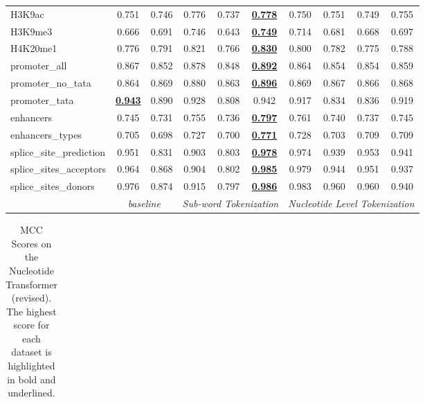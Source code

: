 \begin{table*}[h!]
\begin{center}
\begin{tabular}{l|cc|ccc|cccc}
H3K9ac & 0.751 & 0.746 & 0.776 & 0.737 & {\ul \textbf{0.778}} & 0.750 & 0.751 & 0.749 & 0.755 \\
H3K9me3 & 0.666 & 0.691 & 0.746 & 0.643 & {\ul \textbf{0.749}} & 0.714 & 0.681 & 0.668 & 0.697 \\
H4K20me1 & 0.776 & 0.791 & 0.821 & 0.766 & {\ul \textbf{0.830}} & 0.800 & 0.782 & 0.775 & 0.788 \\
promoter\_all & 0.867 & 0.852 & 0.878 & 0.848 & {\ul \textbf{0.892}} & 0.864 & 0.854 & 0.854 & 0.859 \\
promoter\_no\_tata & 0.864 & 0.869 & 0.880 & 0.863 & {\ul \textbf{0.896}} & 0.869 & 0.867 & 0.866 & 0.868 \\
promoter\_tata & {\ul \textbf{0.943}} & 0.890 & 0.928 & 0.808 & 0.942 & 0.917 & 0.834 & 0.836 & 0.919 \\
enhancers & 0.745 & 0.731 & 0.755 & 0.736 & {\ul \textbf{0.797}} & 0.761 & 0.740 & 0.737 & 0.745 \\
enhancers\_types & 0.705 & 0.698 & 0.727 & 0.700 & {\ul \textbf{0.771}} & 0.728 & 0.703 & 0.709 & 0.709 \\
splice\_site\_prediction & 0.951 & 0.831 & 0.903 & 0.803 & {\ul \textbf{0.978}} & 0.974 & 0.939 & 0.953 & 0.941 \\
splice\_sites\_acceptors & 0.964 & 0.868 & 0.904 & 0.802 & {\ul \textbf{0.985}} & 0.979 & 0.944 & 0.951 & 0.937 \\
splice\_sites\_donors & 0.976 & 0.874 & 0.915 & 0.797 & {\ul \textbf{0.986}} & 0.983 & 0.960 & 0.960 & 0.940 \\
\hline
\multicolumn{1}{l|}{} & \multicolumn{2}{c|}{\textit{baseline}} & \multicolumn{3}{c|}{\textit{Sub-word Tokenization}} & \multicolumn{4}{c}{\textit{Nucleotide Level Tokenization}} \\ \hline
\end{tabular}
\end{center}
\end{table*}\begin{table*}[h!]
\small
\begin{center}
\caption{MCC Scores on the Nucleotide Transformer (revised). The highest score for each dataset is highlighted in bold and underlined.}
\label{table: NTv2 Results MCC}
\begin{tabular}{l|cc|ccc|cccc}
\hline

\end{tabular}
\end{center}
\end{table*}
